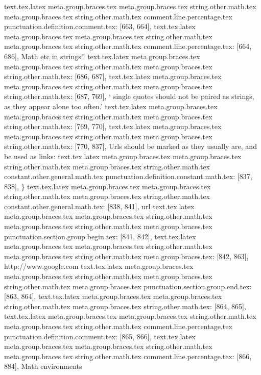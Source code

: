 {{{{{{{{{{{{{{{{{{{{{{{text.tex.latex meta.group.braces.tex meta.group.braces.tex string.other.math.tex meta.group.braces.tex string.other.math.tex comment.line.percentage.tex punctuation.definition.comment.tex: [663, 664], {%
text.tex.latex meta.group.braces.tex meta.group.braces.tex string.other.math.tex meta.group.braces.tex string.other.math.tex comment.line.percentage.tex: [664, 686], { Math etc in strings!!}
text.tex.latex meta.group.braces.tex meta.group.braces.tex string.other.math.tex meta.group.braces.tex string.other.math.tex: [686, 687], {
}
text.tex.latex meta.group.braces.tex meta.group.braces.tex string.other.math.tex meta.group.braces.tex string.other.math.tex: [687, 769], {` single quotes should not be paired as strings, as they appear alone too often.'
}
text.tex.latex meta.group.braces.tex meta.group.braces.tex string.other.math.tex meta.group.braces.tex string.other.math.tex: [769, 770], {
}
text.tex.latex meta.group.braces.tex meta.group.braces.tex string.other.math.tex meta.group.braces.tex string.other.math.tex: [770, 837], {Urls should be marked as they usually are, and be used as links:   }
text.tex.latex meta.group.braces.tex meta.group.braces.tex string.other.math.tex meta.group.braces.tex string.other.math.tex constant.other.general.math.tex punctuation.definition.constant.math.tex: [837, 838], {\}
text.tex.latex meta.group.braces.tex meta.group.braces.tex string.other.math.tex meta.group.braces.tex string.other.math.tex constant.other.general.math.tex: [838, 841], {url}
text.tex.latex meta.group.braces.tex meta.group.braces.tex string.other.math.tex meta.group.braces.tex string.other.math.tex meta.group.braces.tex punctuation.section.group.begin.tex: [841, 842], {{}
text.tex.latex meta.group.braces.tex meta.group.braces.tex string.other.math.tex meta.group.braces.tex string.other.math.tex meta.group.braces.tex: [842, 863], {http://www.google.com}
text.tex.latex meta.group.braces.tex meta.group.braces.tex string.other.math.tex meta.group.braces.tex string.other.math.tex meta.group.braces.tex punctuation.section.group.end.tex: [863, 864], {}}
text.tex.latex meta.group.braces.tex meta.group.braces.tex string.other.math.tex meta.group.braces.tex string.other.math.tex: [864, 865], {
}
text.tex.latex meta.group.braces.tex meta.group.braces.tex string.other.math.tex meta.group.braces.tex string.other.math.tex comment.line.percentage.tex punctuation.definition.comment.tex: [865, 866], {%
text.tex.latex meta.group.braces.tex meta.group.braces.tex string.other.math.tex meta.group.braces.tex string.other.math.tex comment.line.percentage.tex: [866, 884], { Math environments}
}}}}}}}}}}}}}}}}}}}}}}}}}}
